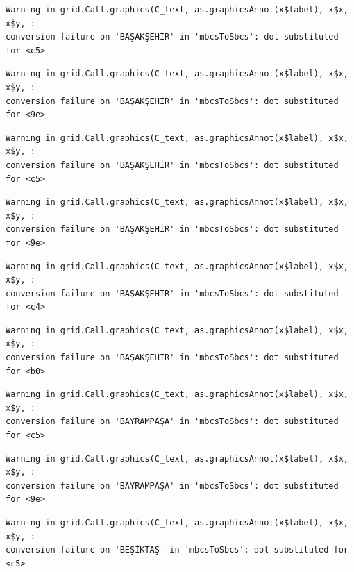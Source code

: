\documentclass[
  11pt,
  a4paper,
  DIV=11,
  numbers=noendperiod]{scrartcl}
\begin{document}
\begin{verbatim}
Warning in grid.Call.graphics(C_text, as.graphicsAnnot(x$label), x$x, x$y, :
conversion failure on 'BAŞAKŞEHİR' in 'mbcsToSbcs': dot substituted for <c5>
\end{verbatim}

\begin{verbatim}
Warning in grid.Call.graphics(C_text, as.graphicsAnnot(x$label), x$x, x$y, :
conversion failure on 'BAŞAKŞEHİR' in 'mbcsToSbcs': dot substituted for <9e>
\end{verbatim}

\begin{verbatim}
Warning in grid.Call.graphics(C_text, as.graphicsAnnot(x$label), x$x, x$y, :
conversion failure on 'BAŞAKŞEHİR' in 'mbcsToSbcs': dot substituted for <c5>
\end{verbatim}

\begin{verbatim}
Warning in grid.Call.graphics(C_text, as.graphicsAnnot(x$label), x$x, x$y, :
conversion failure on 'BAŞAKŞEHİR' in 'mbcsToSbcs': dot substituted for <9e>
\end{verbatim}

\begin{verbatim}
Warning in grid.Call.graphics(C_text, as.graphicsAnnot(x$label), x$x, x$y, :
conversion failure on 'BAŞAKŞEHİR' in 'mbcsToSbcs': dot substituted for <c4>
\end{verbatim}

\begin{verbatim}
Warning in grid.Call.graphics(C_text, as.graphicsAnnot(x$label), x$x, x$y, :
conversion failure on 'BAŞAKŞEHİR' in 'mbcsToSbcs': dot substituted for <b0>
\end{verbatim}

\begin{verbatim}
Warning in grid.Call.graphics(C_text, as.graphicsAnnot(x$label), x$x, x$y, :
conversion failure on 'BAYRAMPAŞA' in 'mbcsToSbcs': dot substituted for <c5>
\end{verbatim}

\begin{verbatim}
Warning in grid.Call.graphics(C_text, as.graphicsAnnot(x$label), x$x, x$y, :
conversion failure on 'BAYRAMPAŞA' in 'mbcsToSbcs': dot substituted for <9e>
\end{verbatim}

\begin{verbatim}
Warning in grid.Call.graphics(C_text, as.graphicsAnnot(x$label), x$x, x$y, :
conversion failure on 'BEŞİKTAŞ' in 'mbcsToSbcs': dot substituted for <c5>
\end{verbatim}
\end{document}
